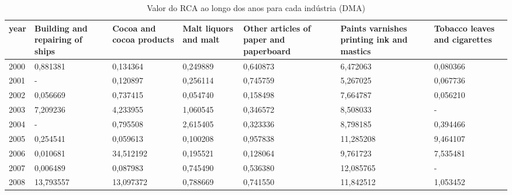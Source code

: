 \begin{table}
\centering
\caption{Valor do RCA ao longo dos anos para cada indústria (DMA)}
\begin{tabular}{p{1cm}p{2cm}p{2cm}p{2cm}p{2cm}p{2cm}p{2cm}}
\toprule
 year &  Building and repairing of ships &  Cocoa and cocoa products &  Malt liquors and malt &  Other articles of paper and paperboard &  Paints varnishes printing ink and mastics &  Tobacco leaves and cigarettes \\
\midrule
 2000 &                         0,881381 &                  0,134364 &               0,249889 &                                0,640873 &                                   6,472063 &                       0,080366 \\
 2001 &                                - &                  0,120897 &               0,256114 &                                0,745759 &                                   5,267025 &                       0,067736 \\
 2002 &                         0,056669 &                  0,737415 &               0,054740 &                                0,158498 &                                   7,664787 &                       0,056210 \\
 2003 &                         7,209236 &                  4,233955 &               1,060545 &                                0,346572 &                                   8,508033 &                              - \\
 2004 &                                - &                  0,795508 &               2,615405 &                                0,323336 &                                   8,798185 &                       0,394466 \\
 2005 &                         0,254541 &                  0,059613 &               0,100208 &                                0,957838 &                                  11,285208 &                       9,464107 \\
 2006 &                         0,010681 &                 34,512192 &               0,195521 &                                0,128064 &                                   9,761723 &                       7,535481 \\
 2007 &                         0,006489 &                  0,087983 &               0,745490 &                                0,536380 &                                  12,085765 &                              - \\
 2008 &                        13,793557 &                 13,097372 &               0,788669 &                                0,741550 &                                  11,842512 &                       1,053452 \\

\end{tabular}
\end{table}
